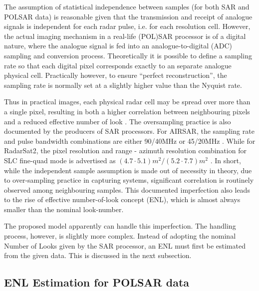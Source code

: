 \documentclass[journal,12pt,draftcls,onecolumn]{IEEEtran}
\begin{document}
The assumption of statistical independence between samples (for both SAR and POLSAR data) is reasonable given that 
  the transmission and receipt of analogue signals is independent for each radar pulse, i.e. for each resolution cell.
However, the actual imaging mechanism in a real-life (POL)SAR processor is of a digital nature,
  where the analogue signal is fed into an analogue-to-digital (ADC) sampling and conversion process.  
Theoretically it is possible to define a sampling rate so that each digital pixel corresponds exactly to an separate analogue physical cell.
Practically however, to ensure ``perfect reconstruction'', the sampling rate is normally set at a slightly higher value than the Nyquist rate. 

Thus in practical images, each physical radar cell may be spread over more than a single pixel,
resulting in both %
  a higher correlation between neighbouring pixels \cite{Raney_1988_TGRS_666} %
  and a reduced effective number of look\cite{Lee_1994_TGRS_1017} \cite{Anfinsen_2009_TGRS_3795}. 
The oversampling practice is also documented by the producers of SAR processors.
For AIRSAR, the sampling rate and pulse bandwidth combinations are either 90/40MHz or 45/20MHz \cite{JPL_2013_Web_AIRSAR_Impl}.
While for RadarSat2, the pixel resolution and range - azimuth resolution combination for SLC fine-quad mode is advertised as $(4.7 \cdot 5.1)m^2/(5.2 \cdot 7.7)m^2$ \cite{MDA_2013_Web_RadatSat2_Description}.
In short, while the independent sample assumption is made out of necessity in theory,
  due to over-sampling practice in capturing systems, significant correlation is routinely observed among neighbouring samples. %
This documented imperfection also leads to the rise of effective number-of-look concept (ENL),
  which is almost always smaller than the nominal look-number. 

The proposed model apparently can handle this imperfection. %
The handling process, however, is slightly more complex.
Instead of adopting the nominal Number of Looks given by the SAR processor,
  an ENL must first be estimated from the given data.
This is discussed in the next subsection.

\subsection{ENL Estimation for POLSAR data}
\label{sec:valid_enl_estimation}
\end{document}
